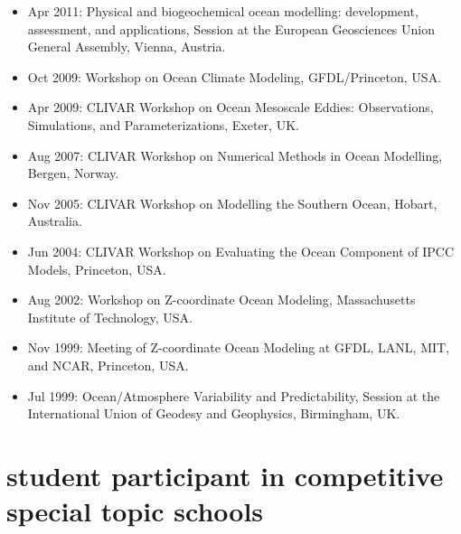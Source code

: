 \documentclass{article}
\begin{document}
\begin{itemize}[leftmargin=*]
\item Apr 2011: {\sc Physical and biogeochemical ocean modelling:
  development, assessment, and applications}, Session at the European
Geosciences Union General Assembly, Vienna, Austria.

\item Oct 2009: {\sc Workshop on Ocean Climate Modeling},
  GFDL/Princeton, USA.

 \item Apr 2009: {\sc CLIVAR Workshop on Ocean Mesoscale Eddies:
    Observations, Simulations, and Parameterizations}, Exeter, UK.

\item Aug 2007: {\sc CLIVAR Workshop on Numerical Methods in Ocean
  Modelling}, Bergen, Norway.

\item Nov 2005: {\sc CLIVAR Workshop on Modelling the Southern
  Ocean}, Hobart, Australia.

\item Jun 2004: {\sc CLIVAR Workshop on Evaluating the Ocean
  Component of IPCC Models}, Princeton, USA.

\item Aug 2002: {\sc Workshop on Z-coordinate Ocean Modeling},
Massachusetts Institute of Technology, USA.

\item Nov 1999: {\sc Meeting of Z-coordinate Ocean Modeling at GFDL,
  LANL, MIT, and NCAR}, Princeton, USA.

\item Jul 1999: {\sc Ocean/Atmosphere Variability and
  Predictability}, Session at the International Union of Geodesy and
Geophysics, Birmingham, UK.

\end{itemize}


\section*{\sc \color{Maroon}  student participant in competitive special topic schools}
\vspace{-.3cm}
\end{document}
